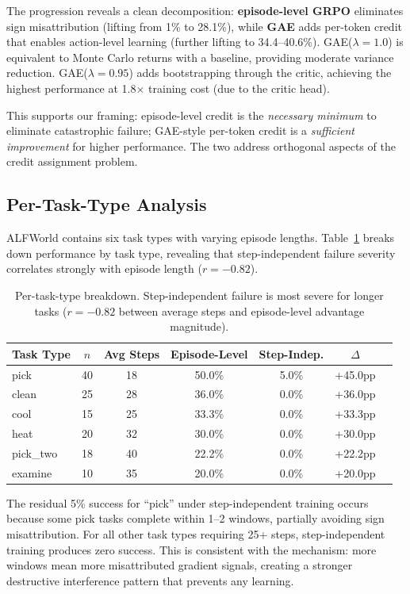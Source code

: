 \documentclass[11pt]{article}
\begin{document}
The progression reveals a clean decomposition: \textbf{episode-level GRPO} eliminates sign misattribution (lifting from 1\% to 28.1\%), while \textbf{GAE} adds per-token credit that enables action-level learning (further lifting to 34.4--40.6\%). GAE($\lambda=1.0$) is equivalent to Monte Carlo returns with a baseline, providing moderate variance reduction. GAE($\lambda=0.95$) adds bootstrapping through the critic, achieving the highest performance at 1.8$\times$ training cost (due to the critic head).

This supports our framing: episode-level credit is the \emph{necessary minimum} to eliminate catastrophic failure; GAE-style per-token credit is a \emph{sufficient improvement} for higher performance. The two address orthogonal aspects of the credit assignment problem.

\subsection{Per-Task-Type Analysis}
\label{sec:pertask}

ALFWorld contains six task types with varying episode lengths. Table~\ref{tab:pertask} breaks down performance by task type, revealing that step-independent failure severity correlates strongly with episode length ($r = -0.82$).

\begin{table}[h]
\centering
\caption{Per-task-type breakdown. Step-independent failure is most severe for longer tasks ($r=-0.82$ between average steps and episode-level advantage magnitude).}
\label{tab:pertask}
\begin{tabular}{lcccccc}
\toprule
Task Type & $n$ & Avg Steps & Episode-Level & Step-Indep. & $\Delta$ \\
\midrule
pick & 40 & 18 & 50.0\% & 5.0\% & +45.0pp \\
clean & 25 & 28 & 36.0\% & 0.0\% & +36.0pp \\
cool & 15 & 25 & 33.3\% & 0.0\% & +33.3pp \\
heat & 20 & 32 & 30.0\% & 0.0\% & +30.0pp \\
pick\_two & 18 & 40 & 22.2\% & 0.0\% & +22.2pp \\
examine & 10 & 35 & 20.0\% & 0.0\% & +20.0pp \\
\bottomrule
\end{tabular}
\end{table}

The residual 5\% success for ``pick'' under step-independent training occurs because some pick tasks complete within 1--2 windows, partially avoiding sign misattribution. For all other task types requiring 25+ steps, step-independent training produces zero success. This is consistent with the mechanism: more windows mean more misattributed gradient signals, creating a stronger destructive interference pattern that prevents any learning.
\end{document}
